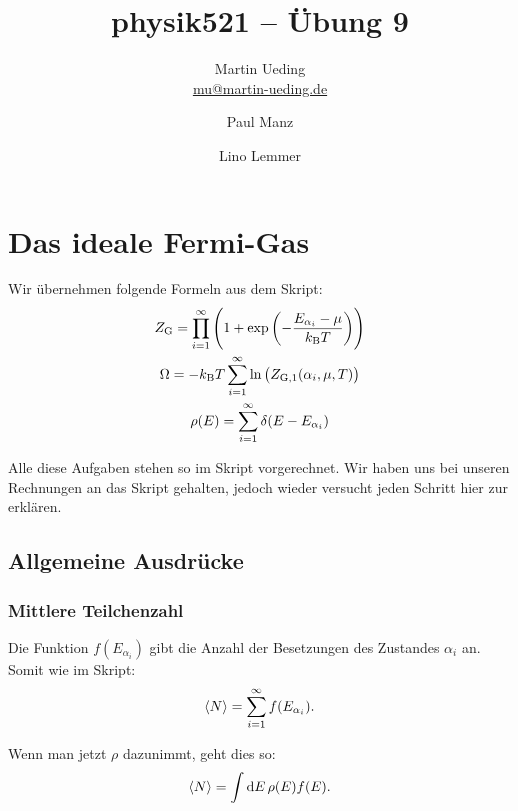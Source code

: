 

\hypersetup{
	pdftitle=
}

\title{physik521 -- Übung 9}
\author{
	Martin Ueding \\ \small{\href{mailto:mu@martin-ueding.de}{mu@martin-ueding.de}}
        \and
        Paul Manz
        \and
        Lino Lemmer
}

\pagestyle{plain}



\maketitle

\section{Das ideale Fermi-Gas}

\newcommand\kB{k_\text B}
\newcommand\ZG{Z_\text G}
\newcommand\ZGe{Z_{\text G, 1}}
\newcommand\Eai{E_{\alpha_i}}
\newcommand\isum{\sum_{i=1}^\infty }

Wir übernehmen folgende Formeln aus dem Skript:
\begin{gather*}
    \ZG = \prod_{i=1}^\infty \del{1 + \exp\del{- \frac{\Eai - \mu}{\kB T}}} \\
    \Omega = - \kB T \isum \ln \del{\ZGe(\alpha_i, \mu, T)} \\
    \rho(E) = \isum \delta(E - \Eai)
\end{gather*}

Alle diese Aufgaben stehen so im Skript vorgerechnet. Wir haben uns bei
unseren Rechnungen an das Skript gehalten, jedoch wieder versucht jeden
Schritt hier zur erklären.

\subsection{Allgemeine Ausdrücke}

\subsubsection{Mittlere Teilchenzahl}

Die Funktion $f(\Eai)$ gibt die Anzahl der Besetzungen des Zustandes $\alpha_i$ an. Somit wie im Skript:
\[
    \bracket N = \isum f(\Eai).
\]

Wenn man jetzt $\rho$ dazunimmt, geht dies so:
\[
    \bracket N = \int \dif E \, \rho(E) f(E).
\]

